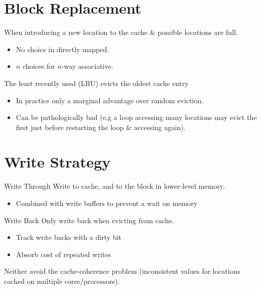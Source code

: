 \section{Block Replacement}
When introducing a new location to the cache \& possible locations are full.
\begin{itemize}
    \item No choice in directly mapped.
    \item $n$ choices for $n$-way associative.
\end{itemize}
The least recently used (LRU) evicts the oldest cache entry
\begin{itemize}
    \item In practice only a marginal advantage over random eviction.
    \item Can be pathologically bad (e.g a loop accessing many locations may evict the first just before restarting the loop \& accessing again).
\end{itemize}

\section{Write Strategy}
\begin{tcbraster}[raster columns=2, raster equal height]
    \begin{definitionbox}{Write Through}
        Write to cache, and to the block in lower-level memory.
        \begin{itemize}
            \item Combined with write buffers to prevent a wait on memory
        \end{itemize}
    \end{definitionbox}
    \begin{definitionbox}{Write Back}
        Only write back when evicting from cache. 
        \begin{itemize}
            \item Track write backs with a dirty bit
            \item Absorb cost of repeated writes
        \end{itemize}
    \end{definitionbox}
\end{tcbraster}
Neither avoid the cache-coherence problem (inconsistent values for locations cached on multiple cores/processors).
